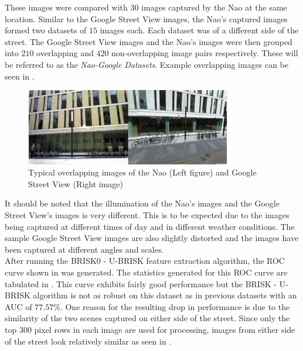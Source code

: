 \documentclass[11pt]{report}
\begin{document}
These images were compared with $30$ images captured by the Nao at the same location. Similar to the Google Street View images, the Nao's captured images formed two datasets of $15$ images each. Each dataset was of a different side of the street. The Google Street View images and the Nao's images were then grouped into $210$ overlapping and $420$ non-overlapping image pairs respectively. These will be referred to as the \textit{Nao-Google Datasets}. Example overlapping images can be seen in .\\

 \begin{figure}[h!] 
  \centering
    \includegraphics[width=0.8\textwidth]{../Drawings/streetView/googleOverlapping.jpg}
    \caption{Typical overlapping images of the Nao (Left figure) and Google Street View (Right image)}
    \label{fig:googleStreetOverlapping}
\end{figure}

It should be noted that the illumination of the Nao's images and the Google Street View's images is very different. This is to be expected due to the images being captured at different times of day and in different weather conditions. The sample Google Street View images are also slightly distorted and the images have been captured at different angles and scales.\\

After running the BRISK0 - U-BRISK feature extraction algorithm, the ROC curve shown in  was generated. The statistics generated for this ROC curve are tabulated in . This curve exhibits fairly good performance but the BRISK - U-BRISK algorithm is not as robust on this dataset as in previous datasets with an AUC of $77.57\%$. One reason for the resulting drop in performance is due to the similarity of the two scenes captured on either side of the street. Since only the top $300$ pixel rows in each image are used for processing, images from either side of the street look relatively similar as seen in .\\
\end{document}
